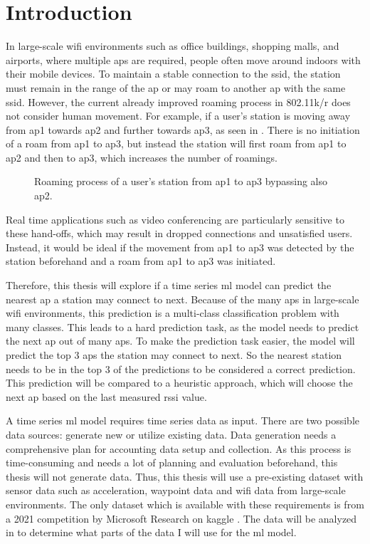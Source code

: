 \chapter{Introduction}\label{ch:intro}

In large-scale \ac{wifi} environments such as office buildings, shopping malls, and airports, where multiple \acp{ap} are required, people often move around indoors with their mobile devices.
To maintain a stable connection to the \ac{ssid}, the station must remain in the range of the \ac{ap} or may roam to another \ac{ap} with the same \ac{ssid}.
However, the current already improved roaming process in 802.11k/r\cite{802.11k}\cite{802.11r} does not consider human movement.
For example, if a user's station is moving away from \ac{ap}1 towards \ac{ap}2 and further towards \ac{ap}3, as seen in .
There is no initiation of a roam from \ac{ap}1 to \ac{ap}3, but instead the station will first roam from \ac{ap}1 to \ac{ap}2 and then to \ac{ap}3, which increases the number of roamings.

\begin{figure}[h]
    \centering
    
    \caption{Roaming process of a user's station from \ac{ap}1 to \ac{ap}3 bypassing also \ac{ap}2.}
    \label{fig:roaming}
\end{figure}

Real time applications such as video conferencing are particularly sensitive to these hand-offs, which may result in dropped connections and unsatisfied users.
Instead, it would be ideal if the movement from \ac{ap}1 to \ac{ap}3 was detected by the station beforehand and a roam from \ac{ap}1 to \ac{ap}3 was initiated.

Therefore, this thesis will explore if a time series \ac{ml} model can predict the nearest \ac{ap} a station may connect to next.
Because of the many \acp{ap} in large-scale \ac{wifi} environments, this prediction is a multi-class classification problem with many classes.
This leads to a hard prediction task, as the model needs to predict the next \ac{ap} out of many \acp{ap}.
To make the prediction task easier, the model will predict the top 3 \acp{ap} the station may connect to next.
So the nearest station needs to be in the top 3 of the predictions to be considered a correct prediction.
This prediction will be compared to a heuristic approach, which will choose the next \ac{ap} based on the last measured \ac{rssi} value.

A time series \ac{ml} model requires time series data as input.
There are two possible data sources: generate new or utilize existing data. 
Data generation needs a comprehensive plan for accounting data setup and collection.
As this process is time-consuming and needs a lot of planning and evaluation beforehand, this thesis will not generate data.
Thus, this thesis will use a pre-existing dataset with sensor data such as acceleration, waypoint data and \ac{wifi} data from large-scale environments.
The only dataset which is available with these requirements is from a 2021 competition by Microsoft Research \cite{IndoorLocationNavigation} on kaggle \cite{kaggle}.
The data will be analyzed in  to determine what parts of the data I will use for the \ac{ml} model.

